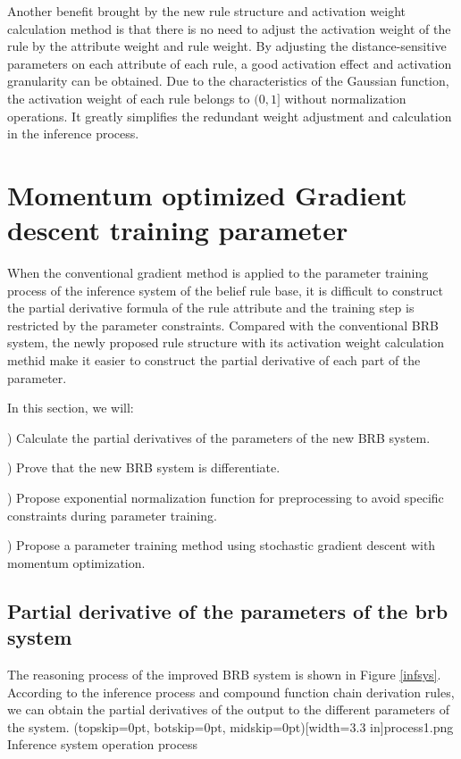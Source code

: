 \documentclass{ieeeaccess}
\begin{document}
Another benefit brought by the new rule structure and activation weight calculation method is that
there is no need to adjust the activation weight of the rule by the attribute weight and rule weight.
By adjusting the distance-sensitive parameters on each attribute of each rule, a good activation effect and activation granularity can be obtained.
Due to the characteristics of the Gaussian function, the activation weight of each rule belongs to $(0, 1]$ without normalization operations.
It greatly simplifies the redundant weight adjustment and calculation in the inference process.


\section{Momentum optimized Gradient descent training parameter}
When the conventional gradient method is applied to the parameter training process of the inference system of the belief rule base,
it is difficult to construct the partial derivative formula of the rule attribute and the training step is restricted by the parameter constraints.
Compared with the conventional BRB system, the newly proposed rule structure with its activation weight calculation methid make it easier to construct the partial derivative of each part of the parameter.

In this section, we will:

) Calculate the partial derivatives of the parameters of the new BRB system.

) Prove that the new BRB system is differentiate.

) Propose exponential normalization function for preprocessing to avoid specific constraints during parameter training.

) Propose a parameter training method using stochastic gradient descent with momentum optimization.


\subsection{Partial derivative of the parameters of the brb system}
The reasoning process of the improved BRB system is shown in Figure \ref{infsys}.
According to the inference process and compound function chain derivation rules, we can obtain the partial derivatives of the output to the different parameters of the system.
\Figure[!t](topskip=0pt, botskip=0pt, midskip=0pt)[width=3.3 in]{process1.png}
{Inference system operation process\label{infsys}}
\end{document}
